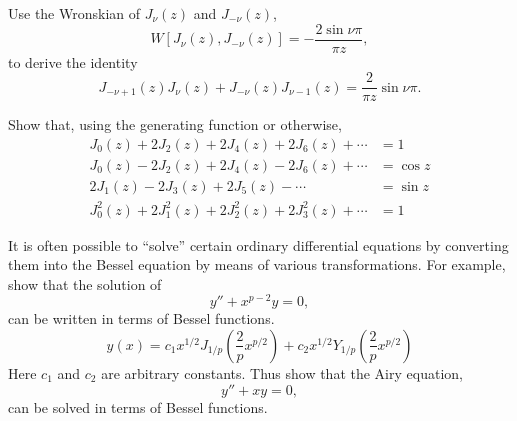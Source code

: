 {%
\begin{Exercise}
  Use the Wronskian of $J_\nu(z)$ and $J_{-\nu}(z)$,
  \[
  W \left[ J_\nu(z),J_{-\nu}(z) \right] = - \frac{2 \sin \nu \pi}{\pi z},
  \]
  to derive the identity
  \[
  J_{-\nu+1}(z) J_{\nu}(z) + J_{-\nu}(z)J_{\nu-1}(z) = \frac{2}{\pi z} \sin \nu \pi.  
  \]
\end{Exercise}





\begin{Exercise}
  Show that, using the generating function or otherwise,
  \begin{align*}
    J_0(z) + 2 J_2(z) + 2 J_4(z) + 2 J_6(z) + \cdots &= 1 
    \\
    J_0(z) - 2 J_2(z) + 2 J_4(z) - 2 J_6(z) + \cdots &= \cos z 
    \\
    2 J_1(z) - 2 J_3(z) + 2 J_5(z) - \cdots &= \sin z 
    \\
    J_0^2(z) + 2 J_1^2(z) + 2 J_2^2(z) + 2 J_3^2(z) + \cdots &= 1
  \end{align*}
\end{Exercise}






\begin{Exercise}
  It is often possible to ``solve'' certain ordinary
  differential equations by converting them into the Bessel equation by
  means of various transformations. For example, show that the solution of
  \[
  y'' + x^{p-2} y = 0,
  \]
  can be written in terms of Bessel functions.
  \[
  y(x) = c_1 x^{1/2} J_{1/p} \left( \frac{2}{p} x^{p/2} \right) +
  c_2 x^{1/2} Y_{1/p} \left( \frac{2}{p} x^{p/2} \right)
  \]
  Here $c_1$ and $c_2$ are arbitrary constants. Thus show that the Airy
  equation,
  \[
  y'' + x y = 0,
  \]
  can be solved in terms of Bessel functions.
\end{Exercise}







}
